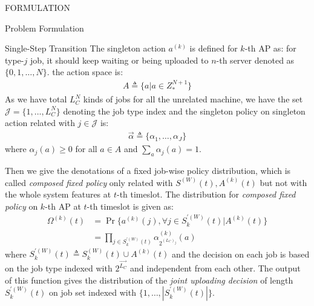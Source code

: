\documentclass[10pt, conference, letterpaper]{IEEEtran}
\begin{document}
\begin{section}{FORMULATION}
\begin{subsection}{Problem Formulation}
\begin{subsubsection}{Single-Step Transition}
                The singleton action $a^{(k)}$ is defined for $k$-th AP as: for type-$j$ job, it should keep waiting or being uploaded to $n$-th server denoted as $\{0,1,\dots,N\}$. the action space is:
                \begin{align}
                    A \triangleq \{a|a \in Z_*^{N+1}\}
                \end{align}
                As we have total $L_C^{N}$ kinds of jobs for all the unrelated machine, we have the set $\mathcal{J}=\{1, \dots, L_C^{N}\}$ denoting the job type index and the singleton policy on singleton action related with $j \in \mathcal{J}$ is:
                \begin{align}
                    \vec{\alpha} \triangleq \{\alpha_1,\dots,\alpha_J\}
                \end{align}
                where $\alpha_j(a) \geq 0$ for all $a \in A$ and $\sum_a \alpha_j(a) = 1$.

                Then we give the denotations of a fixed job-wise policy distribution, which is called \emph{composed fixed policy} only related with $S^{(W)}(t), A^{(k)}(t)$ but not with the whole system features at $t$-th timeslot. The distribution for \emph{composed fixed policy} on $k$-th AP at $t$-th timeslot is given as:
                \begin{align}
                    \Omega^{(k)}(t) &= \Pr\{a^{(k)}(j), \forall j \in S^{'(W)}_k(t) | A^{(k)}(t)\}
                    \nonumber\\
                    &= \prod_{j \in S^{'(W)}_k(t)} \alpha_{2^{(L_C)_j}}^{(k)}(a)
                \end{align}
                where $S^{'(W)}_k(t) \triangleq S^{(W)}_k(t) \cup A^{(k)}(t)$ and the decision on each job is based on the job type indexed with $2^{\vec{L_C}}$ and independent from each other. The output of this function gives the distribution of the \emph{joint uploading decision} of length $S^{'(W)}_k(t)$ on job set indexed with $\{1,\dots,|S^{'(W)}_k(t)|\}$.


\end{subsubsection}
\end{subsection}
\end{section}
\end{document}
